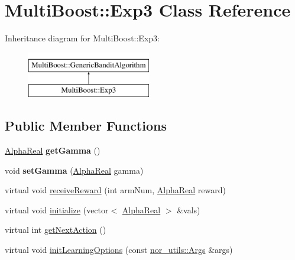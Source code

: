 \hypertarget{classMultiBoost_1_1Exp3}{\section{Multi\-Boost\-:\-:Exp3 Class Reference}
\label{classMultiBoost_1_1Exp3}
}
Inheritance diagram for Multi\-Boost\-:\-:Exp3\-:\begin{figure}[H]
\begin{center}
\leavevmode
\includegraphics[height=2.000000cm]{classMultiBoost_1_1Exp3}
\end{center}
\end{figure}
\subsection*{Public Member Functions}
\begin{DoxyCompactItemize}
\item 
\hypertarget{classMultiBoost_1_1Exp3_a28581884d9f378f0c8158525a9cee906}{\hyperlink{Defaults_8h_a80184c4fd10ab70a1a17c5f97dcd1563}{Alpha\-Real} {\bfseries get\-Gamma} ()}\label{classMultiBoost_1_1Exp3_a28581884d9f378f0c8158525a9cee906}

\item 
\hypertarget{classMultiBoost_1_1Exp3_af1d818ccfd9369791cca8a796c112791}{void {\bfseries set\-Gamma} (\hyperlink{Defaults_8h_a80184c4fd10ab70a1a17c5f97dcd1563}{Alpha\-Real} gamma)}\label{classMultiBoost_1_1Exp3_af1d818ccfd9369791cca8a796c112791}

\item 
virtual void \hyperlink{classMultiBoost_1_1Exp3_aa478135069d5ac28c57eb096ff5e35b7}{receive\-Reward} (int arm\-Num, \hyperlink{Defaults_8h_a80184c4fd10ab70a1a17c5f97dcd1563}{Alpha\-Real} reward)
\item 
virtual void \hyperlink{classMultiBoost_1_1Exp3_a6c8fa5e1c70b5482e77cc0cd263a37f9}{initialize} (vector$<$ \hyperlink{Defaults_8h_a80184c4fd10ab70a1a17c5f97dcd1563}{Alpha\-Real} $>$ \&vals)
\item 
virtual int \hyperlink{classMultiBoost_1_1Exp3_a7937ade0545a4162e2f7419c38be0a97}{get\-Next\-Action} ()
\item 
virtual void \hyperlink{classMultiBoost_1_1Exp3_adb5f9cc04795a8149153305cacfb525f}{init\-Learning\-Options} (const \hyperlink{classnor__utils_1_1Args}{nor\-\_\-utils\-::\-Args} \&args)
\end{DoxyCompactItemize}
